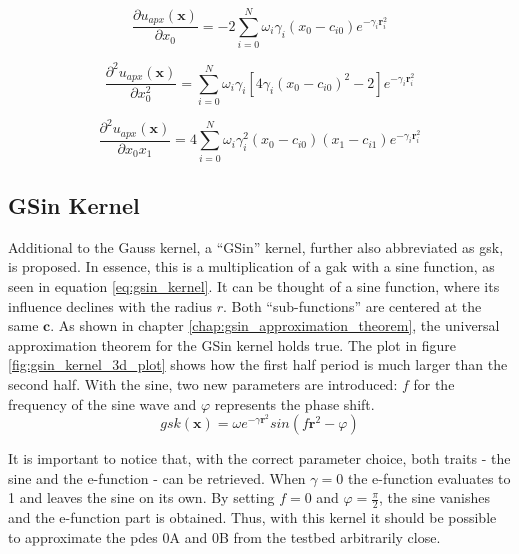 \documentclass[./\jobname.tex]{subfiles}
\begin{document}
\begin{equation}
\label{eq:uapx_gauss_kernel_x0}
\frac{\partial u_{apx}(\mathbf{x})}{\partial x_0} = -2 \sum_{i=0}^{N} \omega_i \gamma_i (x_0 - c_{i0}) e^{-\gamma_i \mathbf{r}_i^2}
\end{equation}

\begin{equation}
\label{eq:uapx_gauss_kernel_x0x0}
\frac{\partial^2 u_{apx}(\mathbf{x})}{\partial x_0^2} = \sum_{i=0}^{N} \omega_i \gamma_i \left[ 4 \gamma_i (x_0 - c_{i0})^2 - 2 \right] e^{-\gamma_i \mathbf{r}_i^2}
\end{equation}

\begin{equation}
\label{eq:uapx_gauss_kernel_x0x1}
\frac{\partial^2 u_{apx}(\mathbf{x})}{\partial x_0 x_1} = 4 \sum_{i=0}^{N} \omega_i \gamma_i^2 (x_0 - c_{i0}) (x_1 - c_{i1}) e^{-\gamma_i \mathbf{r}_i^2} 
\end{equation}

\subsection{GSin Kernel}
\label{chap:gsin_kernel}
Additional to the Gauss kernel, a ``GSin'' kernel, further also abbreviated as \gls{gsk}, is proposed. In essence, this is a multiplication of a \gls{gak} with a sine function, as seen in equation \ref{eq:gsin_kernel}. It can be thought of a sine function, where its influence declines with the radius $r$. Both ``sub-functions'' are centered at the same $\mathbf{c}$. As shown in chapter \ref{chap:gsin_approximation_theorem}, the universal approximation theorem for the GSin kernel holds true. 
The plot in figure \ref{fig:gsin_kernel_3d_plot} shows how the first half period is much larger than the second half. With the sine, two new parameters are introduced: $f$ for the frequency of the sine wave and $\varphi$ represents the phase shift. 
\begin{equation}
\label{eq:gsin_kernel}
gsk(\mathbf{x}) = \omega e^{-\gamma \mathbf{r}^2} sin(f \mathbf{r}^2 - \varphi)
\end{equation}

It is important to notice that, with the correct parameter choice, both traits - the sine and the e-function - can be retrieved. When $\gamma=0$ the e-function evaluates to 1 and leaves the sine on its own. By setting $f=0$ and $\varphi=\frac{\pi}{2}$, the sine vanishes and the e-function part is obtained. Thus, with this kernel it should be possible to approximate the \gls{pde}s 0A and 0B from the testbed arbitrarily close. 
\end{document}
